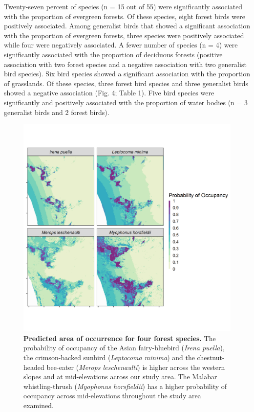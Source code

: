 Twenty-seven percent of species (n = 15 out of 55) were significantly associated with the proportion of evergreen forests.
Of these species, eight forest birds were positively associated.
Among generalist birds that showed a significant association with the proportion of evergreen forests, three species were positively associated while four were negatively associated.
A fewer number of species (n = 4) were significantly associated with the proportion of deciduous forests (positive association with two forest species and a negative association with two generalist bird species).
Six bird species showed a significant association with the proportion of grasslands.
Of these species, three forest bird species and three generalist birds showed a negative association (Fig.
4; Table 1).
Five bird species were significantly and positively associated with the proportion of water bodies (n = 3 generalist birds and 2 forest birds).

\begin{figure}
    \centering
    \includegraphics{figures/hillybirds/fig_06.png}
    \caption{
        \textbf{Predicted area of occurrence for four forest species.} 
        The probability of occupancy of the Asian fairy-bluebird (\textit{Irena puella}), the crimson-backed sunbird (\textit{Leptocoma minima}) and the chestnut-headed bee-eater (\textit{Merops leschenaulti}) is higher across the western slopes and at mid-elevations across our study area. The Malabar whistling-thrush (\textit{Myophonus horsfieldii}) has a higher probability of occupancy across mid-elevations throughout the study area examined.
    }
    \label{hilly_fig_06}
\end{figure}

